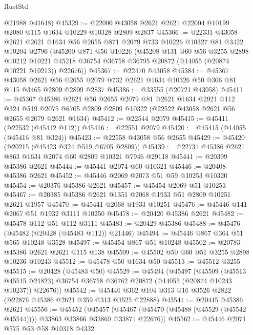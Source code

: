 \begin{lexlean}{RustStd}
\begin{coremodule}
      @21988
      @41648)
@45329 := @22000 @43058 @2621 @2621 @22004 @10199 @2080 @115 @1634 @10229 @10328 @2809 @2837
@45366 := @22331
    @43058
    @2621
    @2621
    @1634
    @56
    @2655
    @871
    @2079
    @733
    @10226
    @10327
    @81
    @3422
    @10204
    @2796
    (@45200
      @871
      @56
      @10226
      (@45208
        @131
        @60
        @56
        @3255
        @2898
        @10212
        @10221
        @45218
        @36754
        @36758
        @36795
        @20872
        (@14055 (@20874 @10221 @10213))
        @22676))
@45367 := @22470 @43058
@45384 := @45367
    @43058
    @2621
    @56
    @2655
    @2079
    @732
    @2621
    @1634
    @10326
    @50
    @306
    @81
    @115
    @3465
    @2809
    @2809
    @2837
@45386 := @33555 (@20721 @43058)
@45411 := @45367
    @45386
    @2621
    @56
    @2655
    @2079
    @81
    @2621
    @1634
    @2921
    @112
    @324
    @519
    @2075
    @6705
    @2809
    @2809
    @10322
    (@22522 @43058 @2621 @56 @2655 @2079 @2621 @1634)
@45412 := @22544 @2079
@45415 := @45411 (@22532 (@45412 @112))
@45416 := @22551 @2079
@45420 := @45415 (@14055 (@45416 @81 @324))
@45423 := @22558 @43058 @56 @2655
@45429 := @45420 (@20215 (@45423 @324 @519 @6705 @2809))
@45439 := @22731 @45386 @2621 @863 @1634 @2074 @60 @2809 @10321 @7946 @29118
@45441 := @20399 @45386 @2621
@45444 := @45441 @2074 @60 @10321
@45446 := @20408 @45386 @2621
@45452 := @45446 @2069 @2073 @51 @59 @10253 @10320
@45454 := @20376 @45386 @2621
@45457 := @45454 @2069 @51 @10253
@45467 := @20385 @45386 @2621 @1351 @2068 @1933 @51 @2809 @10251 @2621 @1957
@45470 := @45441 @2068 @1933 @10251
@45476 := @45446 @141 @2067 @51 @1932 @3111 @10250
@45478 := @20420 @45386 @2621
@45482 := @45478 @112 @51 @112 @3111
@45483 := @20429 @45386
@45488 := @45476 (@45482 (@20428 (@45483 @112)) @21446)
@45494 := @45446 @867 @364 @51 @565 @10248 @3528
@45497 := @45454 @867 @51 @10248
@45502 := @20783 @45386 @2621 @2621 @115 @138
@45509 := @45502 @50 @60 @51 @3255 @2898 @10236 @10243
@45512 := @45478 @50 @1634 @50
@45513 := @45512 @3255
@45515 := @20428 (@45483 @50)
@45529 := @45494
    (@45497
      (@45509
        (@45513 @45515 @21823)
        @36754
        @36758
        @36762
        @20872
        (@14055 (@20874 @10243 @10237))
        @22676))
@45542 := @45446 @362 @104 @313 @16 @3526 @2822 (@22876 @45386 @2621 @359 @313 @3525 @22888)
@45544 := @20445 @45386 @2621
@45556 := @45452
    (@45457 (@45467 (@45470 (@45488 (@45529 (@45542 @45544)))) @33863 @33866 @33869 @33871 @22676))
@45562 := @45446 @2071 @575 @53 @58 @10318 @4332

\end{coremodule}
\end{lexlean}
